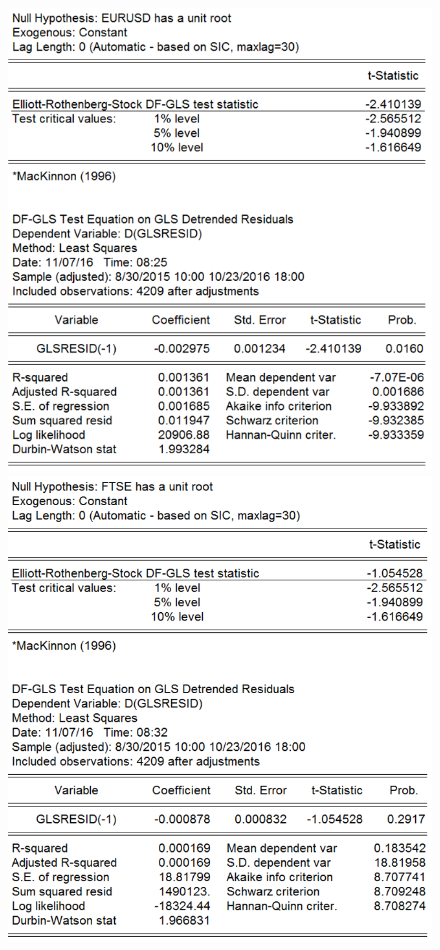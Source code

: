 \documentclass[11pt]{report}
\begin{document}
\begin{figure}[!h]
\begin{minipage}[c]{.46\linewidth}
\includegraphics[scale=0.5]{Appendix/chap2/3}
\end{minipage} \hfill
\begin{minipage}[c]{.46\linewidth}
\includegraphics[scale=0.5]{Appendix/chap2/4}
\end{minipage} \hfill
\end{figure}
\end{document}
